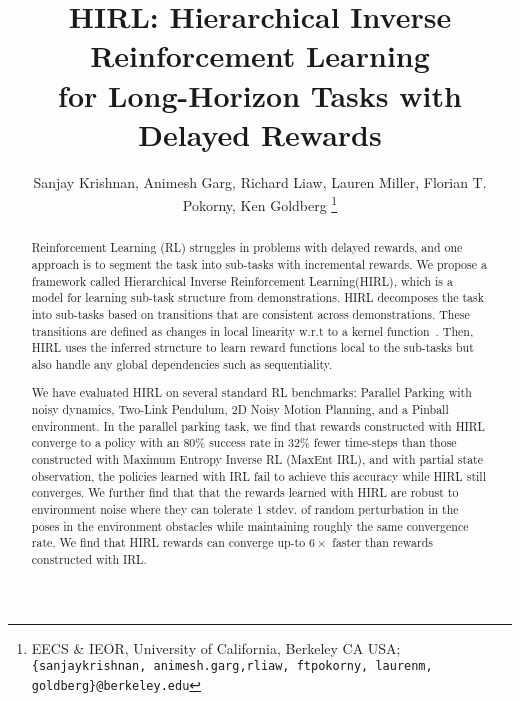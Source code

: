 \documentclass[letterpaper, 10 pt, conference]{ieeeconf}
\title{\LARGE \bf
HIRL: Hierarchical Inverse Reinforcement Learning \\
for Long-Horizon Tasks with Delayed Rewards
}
\author{%
Sanjay Krishnan, 
Animesh Garg, 
Richard Liaw,
Lauren Miller,
Florian T. Pokorny,
Ken Goldberg%
\thanks{EECS \& IEOR, University of California, Berkeley CA USA; \texttt{\{sanjaykrishnan, animesh.garg,rliaw, ftpokorny, laurenm, goldberg\}@berkeley.edu}}%
}
\newcommand{\hirl}{HIRL\xspace}
\newcommand{\hirlfull}{Hierarchical Inverse Reinforcement Learning\xspace}
\begin{document}

\newtheorem{theorem}{Theorem}
\newtheorem{example}{Example}
\newtheorem{definition}{Definition}
\newtheorem{problem}{Problem}
\newtheorem{property}{Property}
\newtheorem{proposition}{Proposition}
\newtheorem{lemma}{Lemma}
\newtheorem{corollary}{Corollary}

\maketitle


\begin{abstract}
Reinforcement Learning (RL) struggles in problems with delayed rewards, and one approach is to segment the task into sub-tasks with incremental rewards.
We propose a framework called \hirlfull (\hirl), which is a model for learning sub-task structure from demonstrations.
\hirl decomposes the task into sub-tasks based on transitions that are consistent across demonstrations. These transitions are defined as changes in local linearity w.r.t to a kernel function~\cite{krishnan2015tsc}. 
Then, \hirl uses the inferred structure to learn reward functions local to the sub-tasks but also handle any global dependencies such as sequentiality.

We have evaluated \hirl on several standard RL benchmarks: Parallel Parking with noisy dynamics, Two-Link Pendulum, 2D Noisy Motion Planning, and a Pinball environment.
In the parallel parking task, we find that rewards constructed with \hirl converge to a policy with an 80\% success rate in 32\% fewer time-steps than those constructed with Maximum Entropy Inverse RL (MaxEnt IRL), and with partial state observation, the policies learned with IRL fail to achieve this accuracy while \hirl still converges.
We further find that that the rewards learned with \hirl are robust to environment noise where they can tolerate 1 stdev. of random perturbation in the poses in the environment obstacles while maintaining roughly the same convergence rate.
We find that \hirl rewards can converge up-to $6\times$ faster than rewards constructed with IRL.
\end{abstract} 


\fontsize{10pt}{12.5pt}
\selectfont




%





\end{document}
